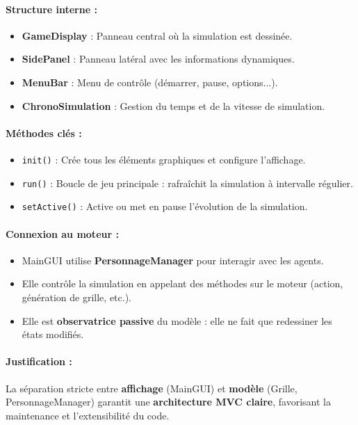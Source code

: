 \paragraph{Structure interne :}
\begin{itemize}
    \item \textbf{GameDisplay} : Panneau central où la simulation est dessinée.
    \item \textbf{SidePanel} : Panneau latéral avec les informations dynamiques.
    \item \textbf{MenuBar} : Menu de contrôle (démarrer, pause, options...).
    \item \textbf{ChronoSimulation} : Gestion du temps et de la vitesse de simulation.
\end{itemize}

\paragraph{Méthodes clés :}
\begin{itemize}
    \item \texttt{init()} : Crée tous les éléments graphiques et configure l'affichage.
    \item \texttt{run()} : Boucle de jeu principale : rafraîchit la simulation à intervalle régulier.
    \item \texttt{setActive()} : Active ou met en pause l'évolution de la simulation.
\end{itemize}

\paragraph{Connexion au moteur :}
\begin{itemize}
    \item MainGUI utilise \textbf{PersonnageManager} pour interagir avec les agents.
    \item Elle contrôle la simulation en appelant des méthodes sur le moteur (action, génération de grille, etc.).
    \item Elle est \textbf{observatrice passive} du modèle : elle ne fait que redessiner les états modifiés.
\end{itemize}

\paragraph{Justification :}
La séparation stricte entre \textbf{affichage} (MainGUI) et \textbf{modèle} (Grille, PersonnageManager) garantit une \textbf{architecture MVC claire}, favorisant la maintenance et l'extensibilité du code.

